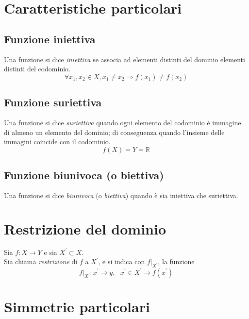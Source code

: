 \documentclass[a4paper,12pt, oneside]{book}
\begin{document}
\section{Caratteristiche particolari}
\subsection{Funzione iniettiva}
\begin{definizione}
Una funzione si dice \emph{iniettiva} se associa ad elementi distinti del dominio elementi distinti del codominio.
\begin{equation}
\forall x_1,x_2\in X, x_1\neq x_2 \Rightarrow f(x_1)\neq f(x_2)
\end{equation}
\end{definizione}
\subsection{Funzione suriettiva}
\begin{definizione}
Una funzione si dice \emph{suriettiva} quando ogni elemento del codominio è immagine di almeno un elemento del dominio; di conseguenza quando l’insieme delle immagini coincide con il codominio.
\begin{equation}
f(X)=Y=\mathbb{R}
\end{equation}
\end{definizione}
\subsection{Funzione biunivoca (o biettiva)}
Una funzione si dice \emph{biunivoca} (o \emph{biettiva}) quando è sia iniettiva che suriettiva.
\section{Restrizione del dominio}
\begin{definizione}
Sia $f:X\rightarrow Y$ e sia $X^{'}\subset X$.\\
Sia chiama \emph{restrizione} di $f$ a $X^{'}$, e si indica con $f|_{X^{'}}$, la funzione
\begin{equation}
f|_{X^{'}}:x^{'}\rightarrow y,\mbox{ } x^{'}\in X^{'} \rightarrow f(x^{'})
\end{equation}
\end{definizione}
\section{Simmetrie particolari}
\end{document}
